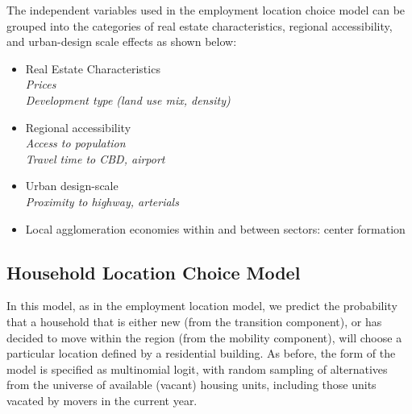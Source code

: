 The independent variables used in the employment location choice
model can be grouped into the categories of real estate
characteristics, regional accessibility, and urban-design scale
effects as shown below:

\begin{itemize}

\item Real Estate Characteristics \\ \emph{Prices} \\
\emph{Development type (land use mix, density)}

\item Regional accessibility \\
\emph{Access to population} \\ \emph{Travel time to CBD, airport}

\item Urban design-scale \\ \emph{Proximity to highway, arterials}

\item Local agglomeration economies within and between sectors: center
formation

\end{itemize}



\subsection{Household Location Choice Model}

In this model, as in the employment location model, we predict the
probability that a household that is either new (from the
transition component), or has decided to move within the region
(from the mobility component), will choose a particular location
defined by a residential building.  As before, the form of the model is
specified as multinomial logit, with random sampling of
alternatives from the universe of available (vacant) housing
units, including those units vacated by movers in the current
year.

